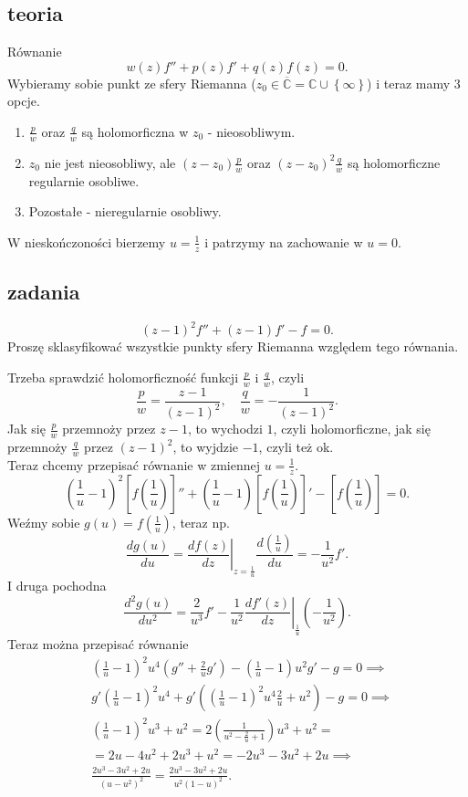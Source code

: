 \documentclass[../main.tex]{subfiles}
\begin{document}
\subsection{teoria}
Równanie
\[
    w(z)f'' + p(z)f' + q(z)f(z) = 0
.\]
    Wybieramy sobie punkt ze sfery Riemanna ($z_0\in \overline{\mathbb{C}} = \mathbb{C}\cup \left\{ \infty \right\}$) i teraz mamy $3$ opcje.
    \begin{enumerate}
        \item $\frac{p}{w}$ oraz $\frac{q}{w}$ są holomorficzna w $z_0$ - nieosobliwym.
        \item $z_0$ nie jest nieosobliwy, ale $(z-z_0)\frac{p}{w}$ oraz $\left( z-z_0 \right) ^2 \frac{q}{w}$ są holomorficzne regularnie osobliwe.
        \item Pozostałe - nieregularnie osobliwy.
    \end{enumerate}
    W nieskończoności bierzemy $u = \frac{1}{z}$ i patrzymy na zachowanie w $u = 0$.
    \subsection{zadania}
    \[
        (z-1)^2f'' + (z-1)f' - f = 0
    .\]
Proszę sklasyfikować wszystkie punkty sfery Riemanna względem tego równania.

Trzeba sprawdzić holomorficzność funkcji $\frac{p}{w}$ i $\frac{q}{w}$, czyli
\[
    \frac{p}{w} = \frac{z-1}{(z-1)^2},\quad \frac{q}{w} = -\frac{1}{(z-1)^2}
.\]
Jak się $\frac{p}{w}$ przemnoży przez $z-1$, to wychodzi $1$, czyli holomorficzne, jak się przemnoży $\frac{q}{w}$ przez $(z-1)^2$, to wyjdzie $-1$, czyli też ok.\\
Teraz chcemy przepisać równanie w zmiennej $u = \frac{1}{z}$.
\[
    \left( \frac{1}{u} - 1 \right) ^2 \left[ f\left(\frac{1}{u}\right) \right]'' + \left( \frac{1}{u} - 1 \right) \left[ f\left( \frac{1}{u} \right)  \right]' - \left[ f\left( \frac{1}{u} \right)  \right] = 0
.\]
Weźmy sobie $g(u) = f\left( \frac{1}{u} \right)$, teraz np.
\[
    \frac{dg(u)}{du} = \left.\frac{df(z)}{dz}\right|_{z = \frac{1}{u}}\frac{d\left( \frac{1}{u} \right) }{du} = -\frac{1}{u^2} f'
.\]
I druga pochodna
\[
    \frac{d^2g(u)}{du^2} = \frac{2}{u^3}f' - \left.\frac{1}{u^2}\frac{df'(z)}{dz}\right|_{\frac{1}{u}} \left( -\frac{1}{u^2} \right)
.\]
Teraz można przepisać równanie
\begin{align*}
    &\left(\frac{1}{u} - 1\right)^2 u^4 \left(g'' + \frac{2}{u}g'\right) - \left(\frac{1}{u} - 1\right)u^2 g' - g = 0 \implies\\
    &g'\left( \frac{1}{u} - 1 \right) ^2 u^4 + g'\left( \left( \frac{1}{u} - 1 \right) ^2 u^4 \frac{2}{u} + u^2 \right) - g = 0 \implies\\
    &\left( \frac{1}{u} - 1 \right) ^2 u^3 + u^2 = 2\left( \frac{1}{u^2 - \frac{2}{u} + 1} \right) u^3 + u^2 =\\
    &=2u - 4u^2 + 2u^3 + u^2 = -2u^3 - 3u^2 + 2u\implies\\
    &\frac{2u^3 - 3u^2 + 2u}{\left( u - u^2 \right) ^2} = \frac{2u^3 - 3u^2 + 2u}{u^2(1 - u)^2}
.\end{align*}
\end{document}
